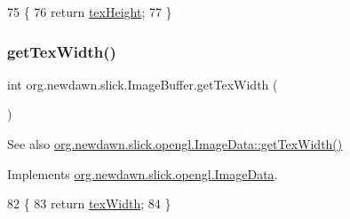\begin{DoxyCode}
75                               \{
76         \textcolor{keywordflow}{return} \mbox{\hyperlink{classorg_1_1newdawn_1_1slick_1_1_image_buffer_a233e898232a8dcd31df4d8c28c70fb66}{texHeight}};
77     \}
\end{DoxyCode}
\mbox{\label{classorg_1_1newdawn_1_1slick_1_1_image_buffer_a9691609c6c7e7776882af57cfd6daab9}} 
\subsubsection{\texorpdfstring{get\+Tex\+Width()}{getTexWidth()}}
{\footnotesize\ttfamily int org.\+newdawn.\+slick.\+Image\+Buffer.\+get\+Tex\+Width (\begin{DoxyParamCaption}{ }\end{DoxyParamCaption})\hspace{0.3cm}{\ttfamily [inline]}}

\begin{DoxySeeAlso}{See also}
\mbox{\hyperlink{interfaceorg_1_1newdawn_1_1slick_1_1opengl_1_1_image_data_abf26e8dcbf2ec52f9a49535d8912263e}{org.\+newdawn.\+slick.\+opengl.\+Image\+Data\+::get\+Tex\+Width()}} 
\end{DoxySeeAlso}


Implements \mbox{\hyperlink{interfaceorg_1_1newdawn_1_1slick_1_1opengl_1_1_image_data_abf26e8dcbf2ec52f9a49535d8912263e}{org.\+newdawn.\+slick.\+opengl.\+Image\+Data}}.


\begin{DoxyCode}
82                              \{
83         \textcolor{keywordflow}{return} \mbox{\hyperlink{classorg_1_1newdawn_1_1slick_1_1_image_buffer_adff2451214c3b558ed4a5a1aa373441c}{texWidth}};
84     \}
\end{DoxyCode}
\mbox{\label{classorg_1_1newdawn_1_1slick_1_1_image_buffer_a802e5461f8a85e80513ccb93da536082}} 
